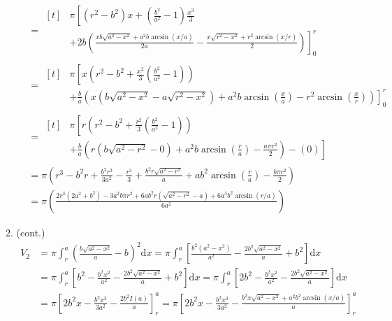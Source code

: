 \documentclass[12pt, A4]{report}
\renewcommand{\d}{\text{d}}
\begin{document}
\begin{enumerate}
\begin{enumerate}
\begin{align*}
										&= \begin{aligned}[t] &\pi\left[(r^2 - b^2)x + \left(\frac{b^2}{a^2} - 1 \right)\frac{x^3}{3}\right. \\ 
											&\left.+ 2b\left(\frac{xb\sqrt{a^2 - x^2} + a^2b\arcsin(x/a)}{2a} - \frac{x\sqrt{r^2 - x^2} + r^2\arcsin(x/r)}{2}\right)\right]_0^r \end{aligned} \\
										&= \begin{aligned}[t]&\pi\left[x\left(r^2 - b^2 + \frac{x^2}{3}\left(\frac{b^2}{a^2} - 1\right)\right)\right. \\ 
											&\left.+ \frac{b}{a}\left(x\left(b\sqrt{a^2 - x^2} - a\sqrt{r^2 - x^2}\right) + a^2b\arcsin\left(\frac{x}{a}\right) - r^2\arcsin\left(\frac{x}{r}\right)\right)\right]_0^r\end{aligned} \\
										&= \begin{aligned}[t]&\pi\left[r\left(r^2 - b^2 + \frac{r^2}{3}\left(\frac{b^2}{a^2} - 1\right) \right)\right. \\ 
											&\left.+ \frac{b}{a}\left(r\left(b\sqrt{a^2 - r^2} - 0\right) + a^2b\arcsin\left(\frac{r}{a}\right) - \frac{a\pi r^2}{2}\right) - (0)\right]\end{aligned}\\
										&= \pi\left(r^3 - b^2r + \frac{b^2r^3}{3a^2} - \frac{r^3}{3} + \frac{b^2r\sqrt{a^2 - r^2}}{a} + ab^2\arcsin\left(\frac{r}{a}\right) - \frac{b\pi r^2}{2}\right) \\
										&= \pi\left(\frac{2r^3(2a^2+b^2) -3a^2b\pi r^2 + 6ab^2r\left(\sqrt{a^2 - r^2} - a\right) + 6a^3b^2\arcsin(r/a)}{6a^2}\right)
							\end{align*}
							\setcounter{enumii}{1}\item (cont.)
							\begin{align*}
								V_2 &= \pi\int_r^a\left(\frac{b\sqrt{a^2 - x^2}}{a} - b\right)^2\d x
										= \pi\int_r^a\left[\frac{b^2(a^2 - x^2)}{a^2} - \frac{2b^2\sqrt{a^2 - x^2}}{a} + b^2\right]\d x \\
									&= \pi\int_r^a\left[b^2 - \frac{b^2x^2}{a^2} - \frac{2b^2\sqrt{a^2 - x^2}}{a} + b^2\right]\d x
										= \pi\int_r^a\left[2b^2 - \frac{b^2x^2}{a^2} - \frac{2b^2\sqrt{a^2 - x^2}}{a}\right]\d x \\
									&= \pi\left[2b^2x - \frac{b^2x^3}{3a^2} - \frac{2b^2I(a)}{a}\right]_r^a
										= \pi\left[2b^2x - \frac{b^2x^3}{3a^2} - \frac{b^2x\sqrt{a^2 - x^2} + a^2b^2\arcsin(x/a)}{a}\right]_r^a \\

\end{align*}
\end{enumerate}
\end{enumerate}
\end{document}
